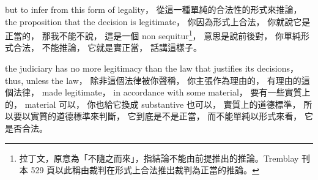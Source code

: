 \hypertarget{w02:cue:1506}{}but to infer from this form of legality，
\hypertarget{w02:cue:1507}{}從這一種單純的合法性的形式來推論，
\hypertarget{w02:cue:1508}{}the proposition that the decision is legitimate，
\hypertarget{w02:cue:1509}{}你因為形式上合法，
\hypertarget{w02:cue:1510}{}你就說它是正當的，
\hypertarget{w02:cue:1511}{}那我不能不說，
\hypertarget{w02:cue:1512}{}這是一個 non sequitur\footnote{拉丁文，原意為「不隨之而來」，指結論不能由前提推出的推論。Tremblay 刊本 529 頁以此稱由裁判在形式上合法推出裁判為正當的推論。}，
\hypertarget{w02:cue:1513}{}意思是說前後對，
\hypertarget{w02:cue:1514}{}你單純形式合法，
\hypertarget{w02:cue:1515}{}不能推論，
\hypertarget{w02:cue:1516}{}它就是實正當，
\hypertarget{w02:cue:1517}{}話講這樣子。

\hypertarget{w02:cue:1518}{}the judiciary has no more legitimacy than the law that justifies its decisions，
\hypertarget{w02:cue:1519}{}thus, unless the law，
\hypertarget{w02:cue:1520}{}除非這個法律被你聲稱，
\hypertarget{w02:cue:1521}{}你主張作為理由的，
\hypertarget{w02:cue:1522}{}有理由的這個法律，
\hypertarget{w02:cue:1523}{}made legitimate，
\hypertarget{w02:cue:1524}{}in accordance with some material，
\hypertarget{w02:cue:1525}{}要有一些實質上的，
\hypertarget{w02:cue:1526}{}material 可以，
\hypertarget{w02:cue:1527}{}你也給它換成 substantive 也可以，
\hypertarget{w02:cue:1528}{}實質上的道德標準，
\hypertarget{w02:cue:1529}{}所以要以實質的道德標準來判斷，
\hypertarget{w02:cue:1530}{}它到底是不是正當，
\hypertarget{w02:cue:1531}{}而不能單純以形式來看，
\hypertarget{w02:cue:1532}{}它是否合法。

